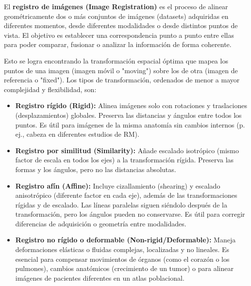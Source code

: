 El \textbf{registro de imágenes (Image Registration)} es el proceso de alinear geométricamente dos o más conjuntos de imágenes (datasets) adquiridas en diferentes momentos, desde diferentes modalidades o desde distintos puntos de vista. El objetivo es establecer una correspondencia punto a punto entre ellas para poder comparar, fusionar o analizar la información de forma coherente.

Esto se logra encontrando la transformación espacial óptima que mapea los puntos de una imagen (imagen móvil o "moving") sobre los de otra (imagen de referencia o "fixed"). Los tipos de transformación, ordenados de menor a mayor complejidad y flexibilidad, son:
\begin{itemize}
\item \textbf{Registro rígido (Rigid):} Alinea imágenes solo con rotaciones y traslaciones (desplazamientos) globales. Preserva las distancias y ángulos entre todos los puntos. Es útil para imágenes de la misma anatomía sin cambios internos (p. ej., cabeza en diferentes estudios de RM).
\item \textbf{Registro por similitud (Similarity):} Añade escalado isotrópico (mismo factor de escala en todos los ejes) a la transformación rígida. Preserva las formas y los ángulos, pero no las distancias absolutas.
\item \textbf{Registro afín (Affine):} Incluye cizallamiento (shearing) y escalado anisotrópico (diferente factor en cada eje), además de las transformaciones rígidas y de escalado. Las líneas paralelas siguen siéndolo después de la transformación, pero los ángulos pueden no conservarse. Es útil para corregir diferencias de adquisición o geometría entre modalidades.
\item \textbf{Registro no rígido o deformable (Non-rigid/Deformable):} Maneja deformaciones elásticas o fluidas complejas, localizadas y no lineales. Es esencial para compensar movimientos de órganos (como el corazón o los pulmones), cambios anatómicos (crecimiento de un tumor) o para alinear imágenes de pacientes diferentes en un atlas poblacional.
\end{itemize}
